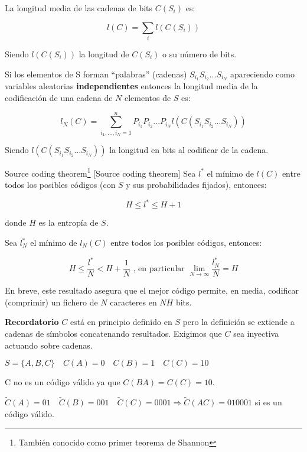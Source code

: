 	\begin{defn}
		La longitud media de las cadenas de bits $C(S_i)$ es:

		$$ l(C) = \sum_i l(C(S_i))$$

		Siendo $l(C(S_i))$ la longitud de $C(S_i)$ o su número de bits.
	\end{defn}

	Si los elementos de S forman ``palabras'' (cadenas) $S_{i_1} S_{i_2} ... S_{i_N}$ apareciendo como variables aleatorias \textbf{independientes} entonces la longitud media de la codificación de una cadena de $N$ elementos de $S$ es:

	$$l_{N}(C) = \sum_{i_1,...,i_N = 1}^{n} P_{i_1} P_{i_2} ... P_{i_N} l(C(S_{i_1} S_{i_2} ... S_{i_N}))$$

	Siendo $l(C(S_{i_1} S_{i_2} ... S_{i_N}))$ la longitud en bits al codificar de la cadena.


	\begin{theorem}{Source coding theorem\footnote{También conocido como primer teorema de Shannon} }[Source coding theorem]
		Sea $l^*$ el mínimo de $l(C)$ entre todos los posibles códigos (con $S$ y sus probabilidades fijados), entonces:

		$$ H \leq l^* \leq H + 1 $$

		donde $H$ es la entropía de $S$.

	\end{theorem}


	\begin{corol}
		\label{corolario minima longitud}
		Sea $l^{*}_N$ el mínimo de $l_N(C)$ entre todos los posibles códigos, entonces:

		$$ H \leq \frac{l^*}{N} < H + \frac{1}{N} \text{ , en particular  } \lim_{N \rightarrow \infty} \frac{l^*_N}{N} = H$$

		En breve, este resultado asegura que el mejor código permite, en media, codificar (comprimir) un fichero de $N$ caracteres en $NH$ bits.

	\end{corol}


	\textbf{Recordatorio} $C$ está en principio definido en $S$ pero la definición se extiende a cadenas de símbolos concatenando resultados. Exigimos que $C$ sea inyectiva actuando sobre cadenas.

	\begin{example}

		$S = \{A,B,C\} \quad C(A) = 0 \quad C(B) = 1 \quad C(C) = 10$

		C no es un código válido ya que $C(BA) = C(C) = 10$.

		$\widetilde{C}(A) = 01 \quad \widetilde{C}(B) = 001 \quad \widetilde{C}(C) = 0001 \Rightarrow \widetilde{C}(AC) = 010001 $ si es un código válido.

	\end{example}


